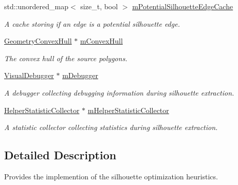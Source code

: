 \begin{DoxyCompactItemize}
std\+::unordered\+\_\+map$<$ size\+\_\+t, bool $>$ \mbox{\hyperlink{classvisilib_1_1_silhouette_processor_ae30799e77e708b67a60f8a7da98c8acf}{m\+Potential\+Silhouette\+Edge\+Cache}}
\begin{DoxyCompactList}\small\item\em A cache storing if an edge is a potential silhouette edge. \end{DoxyCompactList}\item 
\mbox{\label{classvisilib_1_1_silhouette_processor_ad773286df9b2d57c7ab53cb6fda1729d}} 
\mbox{\hyperlink{classvisilib_1_1_geometry_convex_hull}{Geometry\+Convex\+Hull}} $\ast$ \mbox{\hyperlink{classvisilib_1_1_silhouette_processor_ad773286df9b2d57c7ab53cb6fda1729d}{m\+Convex\+Hull}}
\begin{DoxyCompactList}\small\item\em The convex hull of the source polygons. \end{DoxyCompactList}\item 
\mbox{\label{classvisilib_1_1_silhouette_processor_a39e3a419e3a8eaa1754ce3b0c8fce3a0}} 
\mbox{\hyperlink{classvisilib_1_1_visual_debugger}{Visual\+Debugger}} $\ast$ \mbox{\hyperlink{classvisilib_1_1_silhouette_processor_a39e3a419e3a8eaa1754ce3b0c8fce3a0}{m\+Debugger}}
\begin{DoxyCompactList}\small\item\em A debugger collecting debugging information during silhouette extraction. \end{DoxyCompactList}\item 
\mbox{\label{classvisilib_1_1_silhouette_processor_a2695d1a08aa11a3fa5308a7cb29f305f}} 
\mbox{\hyperlink{classvisilib_1_1_helper_statistic_collector}{Helper\+Statistic\+Collector}} $\ast$ \mbox{\hyperlink{classvisilib_1_1_silhouette_processor_a2695d1a08aa11a3fa5308a7cb29f305f}{m\+Helper\+Statistic\+Collector}}
\begin{DoxyCompactList}\small\item\em A statistic collector collecting statistics during silhouette extraction. \end{DoxyCompactList}\end{DoxyCompactItemize}


\subsection{Detailed Description}
Provides the implemention of the silhouette optimization heuristics. 

